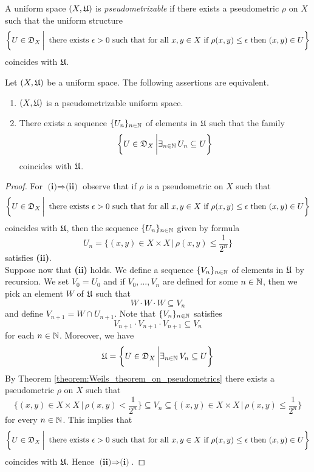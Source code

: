 \begin{definition}
A uniform space $(X,{\mathfrak U})$ is \textit{pseudometrizable} if there exists a pseudometric $\rho$ on $X$ such that the uniform structure
$$\bigg\{U \in {\mathfrak D}_{X}\,\bigg|\,\mbox{ there exists }\epsilon>0\mbox{ such that for all }x,y\in X\mbox{ if }\rho(x,y)\leq \epsilon\mbox{ then }(x,y)\in U\bigg\}$$
coincides with ${\mathfrak U}$.
\end{definition}

\begin{theorem}\label{theorem:characterization_of_pseudometrizable_uniform_spaces}
Let $(X,{\mathfrak U})$ be a uniform space. The following assertions are equivalent.
\begin{enumerate}[label=\emph{\textbf{(\roman*)}}, leftmargin=*]
\item $(X,{\mathfrak U})$ is a pseudometrizable uniform space.
\item There exists a sequence $\{U_n\}_{n\in {\mathbb N}}$ of elements in ${\mathfrak U}$ such that the family
$$\bigg\{U\in {\mathfrak D}_{X}\,\bigg|\exists_{n\in {\mathbb N}}\,U_n \subseteq U\bigg\}$$
coincides with ${\mathfrak U}$.
\end{enumerate}
\end{theorem}
\begin{proof}
For $\textbf{(i)}\Rightarrow \textbf{(ii)}$ observe that if $\rho$ is a pseudometric on $X$ such that 
$$\bigg\{U \in {\mathfrak D}_{X}\,\bigg|\,\mbox{ there exists }\epsilon>0\mbox{ such that for all }x,y\in X\mbox{ if }\rho(x,y)\leq \epsilon\mbox{ then }(x,y)\in U\bigg\}$$
coincides with ${\mathfrak U}$, then the sequence $\{U_n\}_{n\in {\mathbb N}}$ given by formula
$$U_n = \bigg\{(x,y)\in X\times X\,\bigg|\,\rho(x,y) \leq \frac{1}{2^n}\bigg\}$$
satisfies \textbf{(ii)}.\\
Suppose now that \textbf{(ii)} holds. We define a sequence $\{V_n\}_{n\in {\mathbb N}}$ of elements in ${\mathfrak U}$ by recursion. We set $V_0 = U_0$ and if $V_0,...,V_n$ are defined for some $n\in {\mathbb N}$, then we pick an element $W$ of ${\mathfrak U}$ such that 
$$W\cdot W\cdot W \subseteq V_n$$
and define $V_{n+1} = W\cap U_{n+1}$. Note that $\{V_n\}_{n\in {\mathbb N}}$ satisfies
$$V_{n+1}\cdot V_{n+1}\cdot V_{n+1} \subseteq V_n$$
for each $n\in {\mathbb N}$. Moreover, we have
$${\mathfrak U} = \bigg\{U\in {\mathfrak D}_{X}\,\bigg|\exists_{n\in {\mathbb N}}\,V_n \subseteq U\bigg\}$$
By Theorem \ref{theorem:Weils_theorem_on_pseudometrics} there exists a pseudometric $\rho$ on $X$ such that
$$\bigg\{(x,y)\in X\times X\,\bigg|\,\rho(x,y)<\frac{1}{2^n}\bigg\} \subseteq V_n \subseteq \bigg\{(x,y)\in X\times X\,\bigg|\,\rho(x,y) \leq \frac{1}{2^n}\bigg\}$$
for every $n\in {\mathbb N}$. This implies that
$$\bigg\{U \in {\mathfrak D}_{X}\,\bigg|\,\mbox{ there exists }\epsilon>0\mbox{ such that for all }x,y\in X\mbox{ if }\rho(x,y)\leq \epsilon\mbox{ then }(x,y)\in U\bigg\}$$
coincides with ${\mathfrak U}$. Hence $\textbf{(ii)}\Rightarrow \textbf{(i)}$.
\end{proof}

